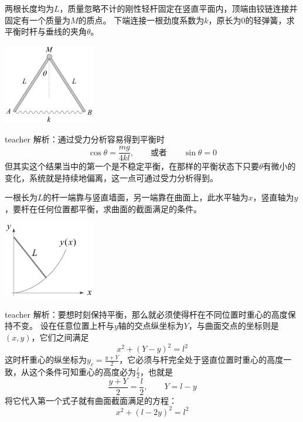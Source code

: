 \begin{example}

两根长度均为$L$，质量忽略不计的刚性轻杆固定在竖直平面内，顶端由铰链连接并固定有一个质量为$M$的质点。
下端连接一根劲度系数为$k$，原长为0的轻弹簧，求平衡时杆与垂线的夹角$\theta$。
\begin{flushright}
\includegraphics[width = 0.3\textwidth]{images/static-force-24.pdf} 
\end{flushright}
\begin{taggedblock}{teacher}
\noindent
解析：通过受力分析容易得到平衡时
\[
\cos\theta = \frac{mg}{4kl},\qquad \text{或者} \qquad \sin\theta = 0
\]
但其实这个结果当中的第一个是不稳定平衡，在那样的平衡状态下只要$\theta$有微小的变化，系统就是持续地偏离，这一点可通过受力分析得到。
\end{taggedblock}
\end{example}
\begin{example}
一根长为$L$的杆一端靠与竖直墙面，另一端靠在曲面上，此水平轴为$x$，竖直轴为$y$，要杆在任何位置都平衡，求曲面的截面满足的条件。
\begin{flushright}
\includegraphics[width = 0.3\textwidth]{images/static-force-22.pdf} 
\end{flushright}

\begin{taggedblock}{teacher}
\noindent
解析：要想时刻保持平衡，那么就必须使得杆在不同位置时重心的高度保持不变。
设在任意位置上杆与$y$轴的交点纵坐标为$Y$，与曲面交点的坐标则是$(x,y)$，它们之间满足
\[
x^2+(Y-y)^2=l^2
\]
这时杆重心的纵坐标为$y_c = \frac{y+Y}{2}$，它必须与杆完全处于竖直位置时重心的高度一致，从这个条件可知重心的高度必为$\frac{l}{2}$，也就是
\[
\frac{y+Y}{2} = \frac{l}{2},\qquad Y = l-y
\]
将它代入第一个式子就有曲面截面满足的方程：
\[
x^2+(l-2y)^2 = l^2
\]
\end{taggedblock}
\end{example}


